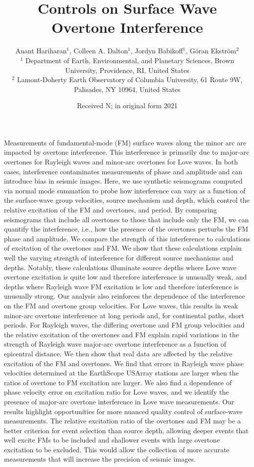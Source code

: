 \documentclass[extra,mreferee]{gji}
\title[Controls on Surface Wave Overtone Interference]
  {Controls on Surface Wave Overtone Interference}
\author[Hariharan et al.]
  {Anant Hariharan$^1$, Colleen A. Dalton$^1$,  Jordyn Babikoff$^1$, G{\"o}ran Ekstr{\"o}m$^2$ \\
  $^1$ Department of Earth, Environmental, and Planetary Sciences, Brown University, Providence, RI, United States\\
  $^2$ Lamont-Doherty Earth Observatory of Columbia University, 61 Route 9W, Palisades, NY 10964, United States}
\date{Received N; in original form 2021 }
\begin{document}
\label{firstpage}

\maketitle


\begin{summary}
Measurements of fundamental-mode (FM) surface waves along the minor arc are impacted by overtone interference. This interference is primarily due to major-arc overtones for Rayleigh waves and minor-arc overtones for Love waves. In both cases, interference contaminates measurements of phase and amplitude and can introduce bias in seismic images. Here, we use synthetic seismograms computed via normal mode summation to probe how interference can vary as a function of the surface-wave group velocities, source mechanism and depth, which control the relative excitation of the FM and overtones, and period. By comparing seismograms that include all overtones to those that include only the FM, we can quantify the interference, i.e., how the presence of the overtones perturbs the FM phase and amplitude. We compare the strength of this interference to calculations of excitation of the overtones and FM. We show that these calculations explain well the varying strength of interference for different source mechanisms and depths. Notably, these calculations illuminate source depths where Love wave overtone excitation is quite low and therefore interference is unusually weak, and depths where Rayleigh wave FM excitation is low and therefore interference is unusually strong. Our analysis also reinforces the dependence of the interference on the FM and overtone group velocities. For Love waves, this results in weak minor-arc overtone interference at long periods and, for continental paths, short periods. For Rayleigh waves, the differing overtone and FM group velocities and the relative excitation of the overtones and FM explain rapid variations in the strength of Rayleigh wave major-arc overtone interference as a function of epicentral distance. We then show that real data are affected by the relative excitation of the FM and overtones. We find that errors in Rayleigh wave phase velocities determined at the EarthScope USArray stations are larger when the ratios of overtone to FM excitation are larger. We also find a dependence of phase velocity error on excitation ratio for Love waves, and we identify the presence of major-arc overtone interference in Love wave measurements. Our results highlight opportunities for more nuanced quality control of surface-wave measurements. The relative excitation ratio of the overtones and FM may be a better criterion for event selection than source depth, allowing deeper events that well excite FMs to be included and shallower events with large overtone excitation to be excluded. This would allow the collection of more accurate
measurements that will increase the precision of seismic images.
\end{summary}
\end{document}
